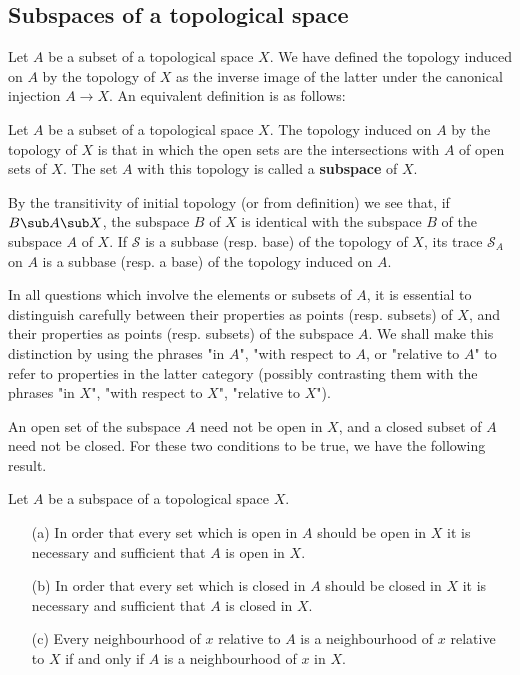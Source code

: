 \subsection{Subspaces of a topological space}
Let $A$ be a subset of a topological space $X$. We have defined the topology induced on $A$ by the topology of $X$ as the inverse image of the latter under the canonical injection $A\to X$. An equivalent definition is as follows:
\begin{definition}
Let $A$ be a subset of a topological space $X$. The topology induced on $A$ by the topology of $X$ is that in which the open sets are the intersections with $A$ of open sets of $X$. The set $A$ with this topology is called a \textbf{subspace} of $X$.
\end{definition}
By the transitivity of initial topology (or from definition) we see that, if $B\sub A\sub X$, the subspace $B$ of $X$ is identical with the subspace $B$ of the subspace $A$ of $X$. If $\mathcal{S}$ is a subbase (resp. base) of the topology of $X$, its trace $\mathcal{S}_A$ on $A$ is a subbase (resp. a base) of the topology induced on $A$.\par
In all questions which involve the elements or subsets of $A$, it is essential to distinguish carefully between their properties as points (resp. subsets) of $X$, and their properties as points (resp. subsets) of the subspace $A$. We shall make this distinction by using the phrases "in $A$", "with respect to $A$, or "relative to $A$" to refer to properties in the latter category (possibly contrasting them with the phrases "in $X$", "with respect to $X$", "relative to $X$").\par
An open set of the subspace $A$ need not be open in $X$, and a closed subset of $A$ need not be closed. For these two conditions to be true, we have the following result.
\begin{proposition}
Let $A$ be a subspace of a topological space $X$.
\begin{itemize}
\item[(a)] In order that every set which is open in $A$ should be open in $X$ it is necessary and sufficient that $A$ is open in $X$.
\item[(b)] In order that every set which is closed in $A$ should be closed in $X$ it is necessary and sufficient that $A$ is closed in $X$.
\item[(c)] Every neighbourhood of $x$ relative to $A$ is a neighbourhood of $x$ relative to $X$ if and only if $A$ is a neighbourhood of $x$ in $X$.
\end{itemize}
\end{proposition}
